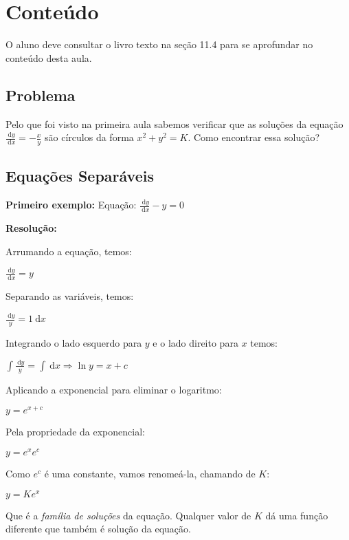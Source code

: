 \documentclass[a4paper]{article}
\newcommand{\ud}{\mathrm{\ d}}
\begin{document}
\section{Conteúdo}

O aluno deve consultar o livro texto na seção 11.4 para se aprofundar
no conteúdo desta aula.

\subsection{Problema}

Pelo que foi visto na primeira aula sabemos verificar que as soluções
da equação $\frac{\ud y}{\ud x} = -\frac{x}{y}$ são círculos da forma
$x^2 + y^2 = K$. Como encontrar essa solução?

\subsection{Equações Separáveis}

{\bf Primeiro exemplo:}
Equação: $\frac{\ud y}{\ud x} - y = 0$

\begin{multicols}{2}
{\bf Resolução:}

Arrumando a equação, temos:

\smallskip

$\frac{\ud y}{\ud x} = y$

\smallskip

Separando as variáveis, temos:

$\frac{\ud y}{y} = 1 \ud x$

\smallskip

Integrando o lado esquerdo para $y$ e o lado direito para $x$ temos:

$\int \frac{\ud y}{y} = \int \ud x \Rightarrow \ln y = x+c$

\smallskip

Aplicando a exponencial para eliminar o logaritmo:

$y = e^{x+c}$

\smallskip

Pela propriedade da exponencial:

$y = e^xe^c$

\smallskip

Como $e^c$ é uma constante, vamos renomeá-la, chamando de $K$:

$y=Ke^x$

\smallskip

Que é a {\em família de soluções} da equação. Qualquer valor de $K$ dá
uma função diferente que também é solução da equação.
\end{multicols}
\end{document}
